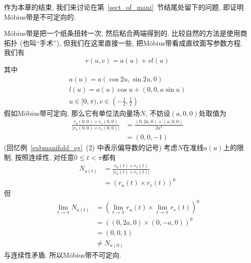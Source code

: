 作为本章的结束, 我们来讨论在第~\ref{sect_of_mani}~节结尾处留下的问题, 即证明M\"{o}bius带是不可定向的.
\begin{eg}
    M\"{o}bius带是把一个纸条扭转一次, 然后粘合两端得到的.
    比较自然的方法是使用商拓扑 (也叫``手术''), 但我们在这里直接一些, 把M\"{o}bius带看成直纹面写参数方程.
    我们有
    \[r(u,v)=a(u)+vl(u)\]
    其中
    \begin{gather*}
        a(u)=a(\cos{2u},\sin{2u},0)\\
        l(u)=a(u)\cos{u}+(0,0,a\sin{u})\\
        u\in[0,\pi),v\in\left(-\frac{1}{2},\frac{1}{2}\right)
    \end{gather*}
    假如M\"{o}bius带可定向, 那么它有单位法向量场$N$, 不妨设$(a,0,0)$处取值为
    \begin{align*}
        \frac{r_u(0,0)\times r_v(0,0)}{|r_u(0,0)\times r_v(0,0)|}&=\frac{(0,2a,0)\times(a,0,0)}{2a^2}\\
        &=(0,0,-1)
    \end{align*}
    (回忆例~\ref{submanifold_eg}~(2) 中表示偏导数的记号)
    考虑$N$在准线$a(u)$上的限制, 按照连续性, 对任意$0\leq t<\pi$都有
    \begin{align*}
        N_{a(t)}&=\frac{r_u(t)\times r_v(t)}{|r_u(t)\times r_v(t)|}\\
        &=(r_u(t)\times r_v(t))^0
    \end{align*}
    但
    \begin{align*}
        \lim_{t\to\pi}N_{a(t)}&=\left(\lim_{t\to\pi}r_u(t)\times\lim_{t\to\pi}r_v(t)\right)^0\\
        &=((0,2a,0)\times(0,-a,0))^0\\
        &=(0,0,1)\\
        &\neq N_{a(0)}
    \end{align*}
    与连续性矛盾.
    所以M\"{o}bius带不可定向.
\end{eg}